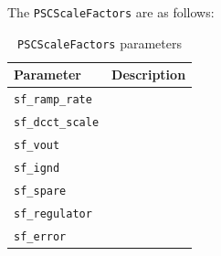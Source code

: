 \bigskip 

The \texttt{PSCScaleFactors} are as follows:
\begin{table}[H]
	\centering
	\begin{tabular}{p{4cm}p{10cm}}
		\toprule
		\textbf{Parameter} & \textbf{Description} \\
		\midrule
		\texttt{sf\_ramp\_rate} &
		\\
		
		\texttt{sf\_dcct\_scale} &
		\\
		
		\texttt{sf\_vout} &
		\\
		
		\texttt{sf\_ignd} &
		\\
		
		\texttt{sf\_spare} &
		\\
		
		\texttt{sf\_regulator} &
		\\
		\texttt{sf\_error} &
		\\
		
		\bottomrule
	\end{tabular}
	\caption{\texttt{PSCScaleFactors} parameters}
	\label{tab:scale-factors}
\end{table}